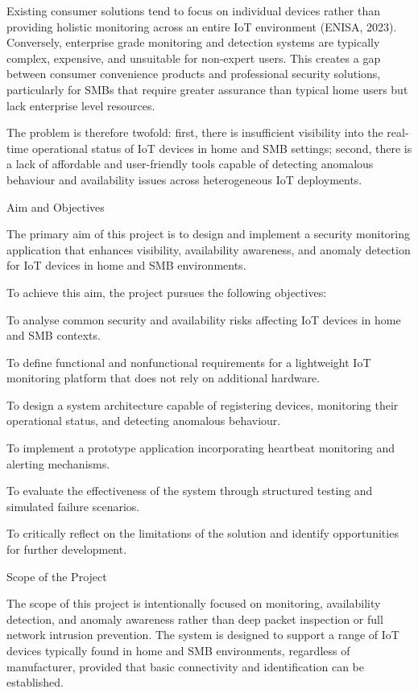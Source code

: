 Existing consumer solutions tend to focus on individual devices rather than providing holistic monitoring across an entire IoT environment (ENISA, 2023). Conversely, enterprise grade monitoring and detection systems are typically complex, expensive, and unsuitable for non-expert users. This creates a gap between consumer convenience products and professional security solutions, particularly for SMBs that require greater assurance than typical home users but lack enterprise level resources.

The problem is therefore twofold: first, there is insufficient visibility into the real-time operational status of IoT devices in home and SMB settings; second, there is a lack of affordable and user-friendly tools capable of detecting anomalous behaviour and availability issues across heterogeneous IoT deployments.

Aim and Objectives

The primary aim of this project is to design and implement a security monitoring application that enhances visibility, availability awareness, and anomaly detection for IoT devices in home and SMB environments.

To achieve this aim, the project pursues the following objectives:

To analyse common security and availability risks affecting IoT devices in home and SMB contexts.

To define functional and nonfunctional requirements for a lightweight IoT monitoring platform that does not rely on additional hardware.

To design a system architecture capable of registering devices, monitoring their operational status, and detecting anomalous behaviour.

To implement a prototype application incorporating heartbeat monitoring and alerting mechanisms.

To evaluate the effectiveness of the system through structured testing and simulated failure scenarios.

To critically reflect on the limitations of the solution and identify opportunities for further development.

Scope of the Project

The scope of this project is intentionally focused on monitoring, availability detection, and anomaly awareness rather than deep packet inspection or full network intrusion prevention. The system is designed to support a range of IoT devices typically found in home and SMB environments, regardless of manufacturer, provided that basic connectivity and identification can be established.

